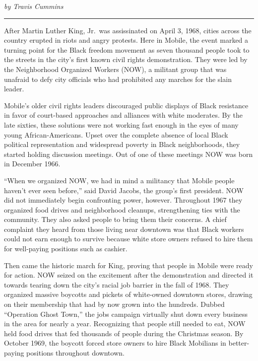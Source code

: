 \documentclass[
]{book}
\begin{document}
\emph{by Travis Cummins}

\begin{center}\rule{0.5\linewidth}{0.5pt}\end{center}

After Martin Luther King, Jr.~was assissinated on April 3, 1968, cities across the country erupted in riots and angry protests. Here in Mobile, the event marked a turning point for the Black freedom movement as seven thousand people took to the streets in the city's first known civil rights demonstration. They were led by the Neighborhood Organized Workers (NOW), a militant group that was unafraid to defy city officials who had prohibited any marches for the slain leader.

Mobile's older civil rights leaders discouraged public displays of Black resistance in favor of court-based approaches and alliances with white moderates. By the late sixties, these solutions were not working fast enough in the eyes of many young African-Americans. Upset over the complete absence of local Black political representation and widespread poverty in Black neighborhoods, they started holding discussion meetings. Out of one of these meetings NOW was born in December 1966.

``When we organized NOW, we had in mind a militancy that Mobile people haven't ever seen before,'' said David Jacobs, the group's first president. NOW did not immediately begin confronting power, however. Throughout 1967 they organized food drives and neighborhood cleanups, strengthening ties with the community. They also asked people to bring them their concerns. A chief complaint they heard from those living near downtown was that Black workers could not earn enough to survive because white store owners refused to hire them for well-paying positions such as cashier.

Then came the historic march for King, proving that people in Mobile were ready for action. NOW seized on the excitement after the demonstration and directed it towards tearing down the city's racial job barrier in the fall of 1968. They organized massive boycotts and pickets of white-owned downtown stores, drawing on their membership that had by now grown into the hundreds. Dubbed ``Operation Ghost Town,'' the jobs campaign virtually shut down every business in the area for nearly a year. Recognizing that people still needed to eat, NOW held food drives that fed thousands of people during the Christmas season. By October 1969, the boycott forced store owners to hire Black Mobilians in better-paying positions throughout downtown.
\end{document}
